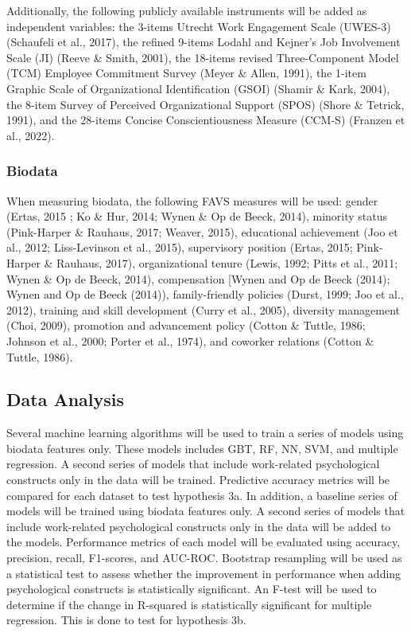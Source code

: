\documentclass[
  man]{apa7}
\begin{document}
Additionally, the following publicly available instruments will be added as independent variables: the 3-items Utrecht Work Engagement Scale (UWES-3) (Schaufeli et al., 2017), the refined 9-items Lodahl and Kejner's Job Involvement Scale (JI) (Reeve \& Smith, 2001), the 18-items revised Three-Component Model (TCM) Employee Commitment Survey (Meyer \& Allen, 1991), the 1-item Graphic Scale of Organizational Identification (GSOI) (Shamir \& Kark, 2004), the 8-item Survey of Perceived Organizational Support (SPOS) (Shore \& Tetrick, 1991), and the 28-items Concise Conscientiousness Measure (CCM-S) (Franzen et al., 2022).

\hypertarget{biodata}{%
\subsubsection{Biodata}\label{biodata}}

When measuring biodata, the following FAVS measures will be used: gender (Ertas, 2015 ; Ko \& Hur, 2014; Wynen \& Op de Beeck, 2014), minority status (Pink-Harper \& Rauhaus, 2017; Weaver, 2015), educational achievement (Joo et al., 2012; Liss-Levinson et al., 2015), supervisory position (Ertas, 2015; Pink-Harper \& Rauhaus, 2017), organizational tenure (Lewis, 1992; Pitts et al., 2011; Wynen \& Op de Beeck, 2014),
compensation {[}Wynen and Op de Beeck (2014); Wynen and Op de Beeck (2014)), family-friendly policies (Durst, 1999; Joo et al., 2012), training and skill development (Curry et al., 2005), diversity management (Choi, 2009), promotion and advancement policy (Cotton \& Tuttle, 1986; Johnson et al., 2000; Porter et al., 1974), and coworker relations (Cotton \& Tuttle, 1986).

\hypertarget{data-analysis-1}{%
\subsection{Data Analysis}\label{data-analysis-1}}

Several machine learning algorithms will be used to train a series of models using biodata features only. These models includes GBT, RF, NN, SVM, and multiple regression. A second series of models that include work-related psychological constructs only in the data will be trained. Predictive accuracy metrics will be compared for each dataset to test hypothesis 3a.
In addition, a baseline series of models will be trained using biodata features only. A second series of models that include work-related psychological constructs only in the data will be added to the models. Performance metrics of each model will be evaluated using accuracy, precision, recall, F1-scores, and AUC-ROC. Bootstrap resampling will be used as a statistical test to assess whether the improvement in performance when adding psychological constructs is statistically significant. An F-test will be used to determine if the change in R-squared is statistically significant for multiple regression. This is done to test for hypothesis 3b.
\end{document}
